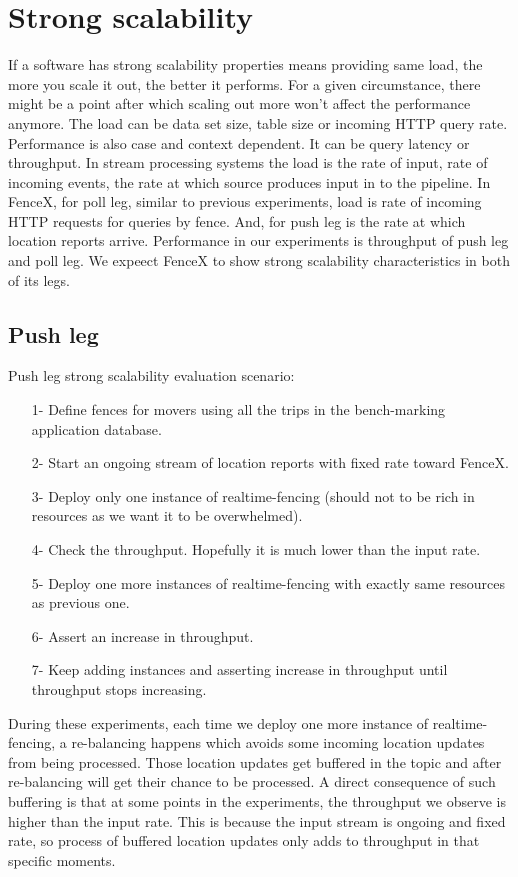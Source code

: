 \documentclass[a4]{report}
\begin{document}
    \section{Strong scalability}
    If a software has strong scalability properties means providing same load, the more you scale it out, the better
    it performs.
    For a given circumstance, there might be a point after which scaling out more won't affect the performance anymore.
    The load can be data set size, table size or incoming HTTP query rate.
    Performance is also case and context dependent.
    It can be query latency or throughput.
    In stream processing systems the load is the rate of input, rate of incoming events, the rate at which source
    produces input in to the pipeline.
    In FenceX, for poll leg, similar to previous experiments, load is rate of incoming HTTP requests for queries by fence.
    And, for push leg is the rate at which location reports arrive.
    Performance in our experiments is throughput of push leg and poll leg.
    We expeect FenceX to show strong scalability characteristics in both of its legs.

    \subsection{Push leg}
    Push leg strong scalability evaluation scenario:
    \begin{itemize}
        \item[1-] Define fences for movers using all the trips in the bench-marking application database.
        \item[2-] Start an ongoing stream of location reports with fixed rate toward FenceX.
        \item[3-] Deploy only one instance of realtime-fencing (should not to be rich in resources as we want it to
        be overwhelmed).
        \item[4-] Check the throughput.
        Hopefully it is much lower than the input rate.
        \item[5-] Deploy one more instances of realtime-fencing with exactly same resources as previous one.
        \item[6-] Assert an increase in throughput.
        \item[7-] Keep adding instances and asserting increase in throughput until throughput stops increasing.
    \end{itemize}

    During these experiments, each time we deploy one more instance of realtime-fencing, a re-balancing happens which
    avoids some incoming location updates from being processed.
    Those location updates get buffered in the topic and after re-balancing will get their chance to be processed.
    A direct consequence of such buffering is that at some points in the experiments, the throughput we observe is
    higher than the input rate.
    This is because the input stream is ongoing and fixed rate, so process of buffered location updates only adds to
    throughput in that specific moments.
\end{document}
